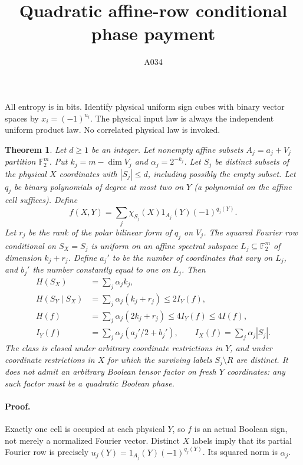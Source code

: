 \documentclass{article}
\newtheorem{theorem}{Theorem}
\begin{document}
\title{Quadratic affine-row conditional phase payment}\author{A034}\maketitle
All entropy is in bits. Identify physical uniform sign cubes with binary
vector spaces by $x_i=(-1)^{u_i}$. The physical input law is always the
independent uniform product law. No correlated physical law is invoked.

\begin{theorem}
Let $d\ge1$ be an integer. Let nonempty affine subsets
$A_j=a_j+V_j$ partition $\mathbb F_2^m$. Put
$k_j=m-\dim V_j$ and $\alpha_j=2^{-k_j}$. Let $S_j$ be distinct subsets
of the physical $X$ coordinates with $|S_j|\le d$, including possibly
the empty subset. Let $q_j$ be binary polynomials of degree at most two
on $Y$ (a polynomial on the affine cell suffices). Define
\[
 f(X,Y)=\sum_j\chi_{S_j}(X)1_{A_j}(Y)(-1)^{q_j(Y)}.
\]
Let $r_j$ be the rank of the polar bilinear form of $q_j$ on $V_j$.
The squared Fourier row conditional on $S_X=S_j$ is uniform on an
affine spectral subspace $L_j\subseteq\mathbb F_2^m$ of dimension
$k_j+r_j$. Define $a_j'$ to be the number of coordinates that vary
on $L_j$, and $b_j'$ the number constantly equal to one on $L_j$.
Then
\begin{align*}
 H(S_X)&=\sum_j\alpha_j k_j,\\
 H(S_Y\mid S_X)&=\sum_j\alpha_j(k_j+r_j)\le2I_Y(f),\\
 H(f)&=\sum_j\alpha_j(2k_j+r_j)\le4I_Y(f)\le4I(f),\\
 I_Y(f)&=\sum_j\alpha_j(a_j'/2+b_j'),\qquad
 I_X(f)=\sum_j\alpha_j|S_j|.
\end{align*}
The class is closed under arbitrary coordinate restrictions in $Y$,
and under coordinate restrictions in $X$ for which the surviving labels
$S_j\setminus R$ are distinct. It does not admit an arbitrary Boolean
tensor factor on fresh $Y$ coordinates: any such factor must be a
quadratic Boolean phase.
\end{theorem}

\paragraph{Proof.}
Exactly one cell is occupied at each physical $Y$, so $f$ is an actual
Boolean sign, not merely a normalized Fourier vector. Distinct $X$
labels imply that its partial Fourier row is precisely
$u_j(Y)=1_{A_j}(Y)(-1)^{q_j(Y)}$. Its squared norm is $\alpha_j$.
\end{document}
